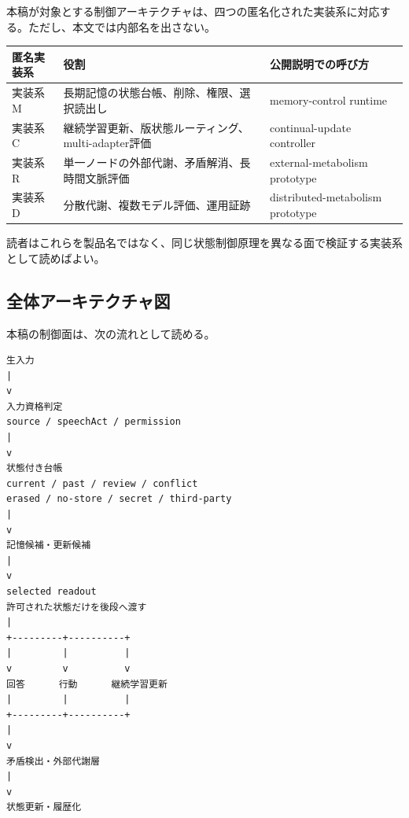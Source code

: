 \documentclass[12pt,a4paper]{article}
\begin{document}
本稿が対象とする制御アーキテクチャは、四つの匿名化された実装系に対応する。ただし、本文では内部名を出さない。

{\def\LTcaptype{table} %
\begin{longtable}[]{@{}
  >{\raggedright\arraybackslash}p{}
  >{\raggedright\arraybackslash}p{}
  >{\raggedright\arraybackslash}p{}@{}}
\toprule\noalign{}
\begin{minipage}[b]{\linewidth}\raggedright
匿名実装系
\end{minipage} & \begin{minipage}[b]{\linewidth}\raggedright
役割
\end{minipage} & \begin{minipage}[b]{\linewidth}\raggedright
公開説明での呼び方
\end{minipage} \\
\midrule\noalign{}
\endhead
\bottomrule\noalign{}
\endlastfoot
実装系 M & 長期記憶の状態台帳、削除、権限、選択読出し & memory-control runtime \\
実装系 C & 継続学習更新、版状態ルーティング、multi-adapter評価 & continual-update controller \\
実装系 R & 単一ノードの外部代謝、矛盾解消、長時間文脈評価 & external-metabolism prototype \\
実装系 D & 分散代謝、複数モデル評価、運用証跡 & distributed-metabolism prototype \\
\end{longtable}
}

読者はこれらを製品名ではなく、同じ状態制御原理を異なる面で検証する実装系として読めばよい。

\subsection{全体アーキテクチャ図}\label{ux5168ux4f53ux30a2ux30fcux30adux30c6ux30afux30c1ux30e3ux56f3}

本稿の制御面は、次の流れとして読める。

\begin{verbatim}
生入力
|
v
入力資格判定
source / speechAct / permission
|
v
状態付き台帳
current / past / review / conflict
erased / no-store / secret / third-party
|
v
記憶候補・更新候補
|
v
selected readout
許可された状態だけを後段へ渡す
|
+---------+----------+
|         |          |
v         v          v
回答      行動      継続学習更新
|         |          |
+---------+----------+
|
v
矛盾検出・外部代謝層
|
v
状態更新・履歴化
\end{verbatim}
\end{document}
